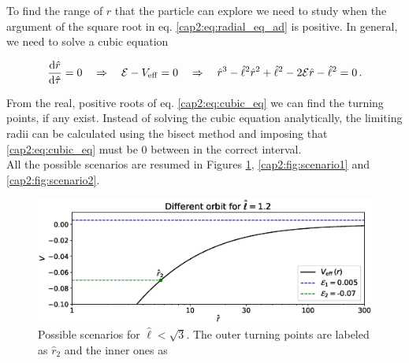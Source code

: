 To find the range of $r$ that the particle can explore we need to study when the
argument of the square root in eq. \ref{cap2:eq:radial_eq_ad} is positive.
In general, we need to solve a cubic equation

\begin{equation}
    \dv{\hat r}{\hat \tau} = 0
    \quad \Rightarrow \quad
    \mathcal E - V_{\rm eff} = 0
    \quad \Rightarrow \quad
    \hat r^3 - \hat \ell^2 \hat r^2 + \hat \ell^2 - 2 \mathcal E
    \hat r - \hat \ell^2 = 0 \, .
    \label{cap2:eq:cubic_eq}
\end{equation}

From the real, positive roots of eq. \ref{cap2:eq:cubic_eq} we can find the
turning points, if any exist.
Instead of solving the cubic equation analytically, the limiting radii can be
calculated using the bisect method and imposing that \ref{cap2:eq:cubic_eq}
must be 0 between in the correct interval. \\
All the possible scenarios are resumed in Figures \ref{cap2:fig:scenario0},
\ref{cap2:fig:scenario1} and \ref{cap2:fig:scenario2}.

\begin{figure}[h!]
    \centering
    \includegraphics[width= 0.8 \textwidth]{Figures/chapter2/scenario0.eps}
    \caption{Possible scenarios for $\hat \ell < \sqrt{3}$.
    The outer turning points are labeled as $\hat r_2$ and the inner ones as}
    \label{cap2:fig:scenario0}
\end{figure}

